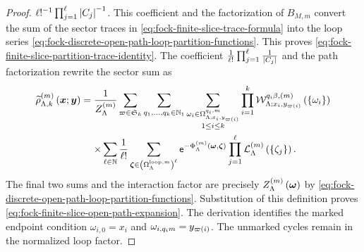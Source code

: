\documentclass[11pt,a4paper]{article}
\theoremstyle{plain}
\theoremstyle{definition}
\theoremstyle{remark}
\begin{document}
\begin{proof}
$\ell!^{-1}\prod_{j=1}^{\ell}\left| C_j \right|^{-1}$.
This coefficient and the factorization of $B_{M,m}$ convert the sum of the sector traces in
\eqref{eq:fock-finite-slice-trace-formula} into the loop series
\eqref{eq:fock-discrete-open-path-loop-partition-functions}.
This proves \eqref{eq:fock-finite-slice-partition-trace-identity}.
The coefficient
$\frac{1}{\ell!}\prod_{j = 1}^{\ell}\frac{1}{\left| C_j \right|}$ and the path factorization rewrite the sector sum as
$$\begin{aligned}
\fun{\widetilde{\rho}_{\Lambda,k}^{(m)}}{\boldsymbol{x};\boldsymbol{y}}
& =
\frac{1}{Z_{\Lambda}^{(m)}}
\sum_{\varpi \in \grsym{k}}
\sum_{q_1,\ldots,q_k \in \semigrposint}
\sum_{\substack{
\omega_i \in \Omega_{\Lambda;x_i,y_{\fun{\varpi}{i}}}^{q_i,m}\\
1 \leq i \leq k}}
\prod_{i = 1}^{k}
\fun{\msrcal{W}_{\Lambda;x_i,y_{\fun{\varpi}{i}}}^{q_i\beta,(m)}}{\setone{\omega_i}}
\\
& \mathrel{\phantom{=}}
\times
\sum_{\ell \in \monnat}\frac{1}{\ell!}
\sum_{\boldsymbol{\zeta}\in\rbk{\Omega_{\Lambda}^{\mathrm{loop},m}}^{\ell}}
\napiernum^{-\fun{\Phi_{\Lambda}^{(m)}}{\boldsymbol{\omega},\boldsymbol{\zeta}}}
\prod_{j = 1}^{\ell}
\fun{\msrcal{L}_{\Lambda}^{(m)}}{\setone{\zeta_j}}.
\end{aligned}$$
The final two sums and the interaction factor are precisely
$Z_{\Lambda}^{(m)} \left( \boldsymbol{\omega} \right)$ by
\eqref{eq:fock-discrete-open-path-loop-partition-functions}.
Substitution of this definition proves \eqref{eq:fock-finite-slice-open-path-expansion}.
The derivation identifies the marked endpoint condition
$\omega_{i,0} = x_i$ and $\omega_{i,q_i m} = y_{\varpi \left( i \right)}$.
The unmarked cycles remain in the normalized loop factor.
\end{proof}
\end{document}
